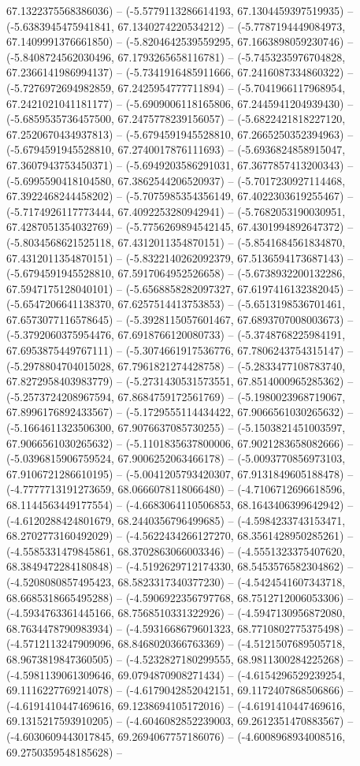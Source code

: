 67.1322375568386036) -- (-5.5779113286614193, 67.1304459397519935) -- (-5.6383945475941841, 67.1340274220534212) -- (-5.7787194449084973, 67.1409991376661850) -- (-5.8204642539559295, 67.1663898059230746) -- (-5.8408724562030496, 67.1793265658116781) -- (-5.7453235976704828, 67.2366141986994137) -- (-5.7341916485911666, 67.2416087334860322) -- (-5.7276972694982859, 67.2425954777711894) -- (-5.7041966117968954, 67.2421021041181177) -- (-5.6909006118165806, 67.2445941204939430) -- (-5.6859535736457500, 67.2475778239156057) -- (-5.6822421818227120, 67.2520670434937813) -- (-5.6794591945528810, 67.2665250352394963) -- (-5.6794591945528810, 67.2740017876111693) -- (-5.6936824858915047, 67.3607943753450371) -- (-5.6949203586291031, 67.3677857413200343) -- (-5.6995590418104580, 67.3862544206520937) -- (-5.7017230927114468, 67.3922468244458202) -- (-5.7075985354356149, 67.4022303619255467) -- (-5.7174926117773444, 67.4092253280942941) -- (-5.7682053190030951, 67.4287051354032769) -- (-5.7756269894542145, 67.4301994892647372) -- (-5.8034568621525118, 67.4312011354870151) -- (-5.8541684561834870, 67.4312011354870151) -- (-5.8322140262092379, 67.5136594173687143) -- (-5.6794591945528810, 67.5917064952526658) -- (-5.6738932200132286, 67.5947175128040101) -- (-5.6568858282097327, 67.6197416132382045) -- (-5.6547206641138370, 67.6257514413753853) -- (-5.6513198536701461, 67.6573077116578645) -- (-5.3928115057601467, 67.6893707008003673) -- (-5.3792060375954476, 67.6918766120080733) -- (-5.3748768225984191, 67.6953875449767111) -- (-5.3074661917536776, 67.7806243754315147) -- (-5.2978804704015028, 67.7961821274428758) -- (-5.2833477108783740, 67.8272958403983779) -- (-5.2731430531573551, 67.8514000965285362) -- (-5.2573724208967594, 67.8684759172561769) -- (-5.1980023968719067, 67.8996176892433567) -- (-5.1729555114434422, 67.9066561030265632) -- (-5.1664611323506300, 67.9076637085730255) -- (-5.1503821451003597, 67.9066561030265632) -- (-5.1101835637800006, 67.9021283658082666) -- (-5.0396815906759524, 67.9006252063466178) -- (-5.0093770856973103, 67.9106721286610195) -- (-5.0041205793420307, 67.9131849605188478) -- (-4.7777713191273659, 68.0666078118066480) -- (-4.7106712696618596, 68.1144563449177554) -- (-4.6683064110506853, 68.1643406399642942) -- (-4.6120288424801679, 68.2440356796499685) -- (-4.5984233743153471, 68.2702773160492029) -- (-4.5622434266127270, 68.3561428950285261) -- (-4.5585331479845861, 68.3702863066003346) -- (-4.5551323375407620, 68.3849472284180848) -- (-4.5192629712174330, 68.5453576582304862) -- (-4.5208080857495423, 68.5823317340377230) -- (-4.5424541607343718, 68.6685318665495288) -- (-4.5906922356797768, 68.7512712006053306) -- (-4.5934763361445166, 68.7568510331322926) -- (-4.5947130956872080, 68.7634478790983934) -- (-4.5931668679601323, 68.7710802775375498) -- (-4.5712113247909096, 68.8468020366763369) -- (-4.5121507689505718, 68.9673819847360505) -- (-4.5232827180299555, 68.9811300284225268) -- (-4.5981139061309646, 69.0794870908271434) -- (-4.6154296529239254, 69.1116227769214078) -- (-4.6179042852042151, 69.1172407868506866) -- (-4.6191410447469616, 69.1238694105172016) -- (-4.6191410447469616, 69.1315217593910205) -- (-4.6046082852239003, 69.2612351470883567) -- (-4.6030609443017845, 69.2694067757186076) -- (-4.6008968934008516, 69.2750359548185628) -- 